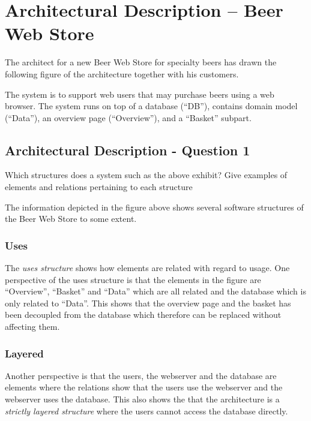 \section{Architectural Description -- Beer Web Store}

The architect for a new Beer Web Store for specialty beers has drawn
the following figure of the architecture together with his customers.
\begin{figure}[h!]
  \centerline{}
\end{figure}
The system is to support web users that may purchase beers using a web
browser. The system runs on top of a database (``DB''), contains
domain model (``Data''), an overview page (``Overview''), and a
``Basket'' subpart.

\subsection{Architectural Description - Question 1}
\label{sec:arch_desc_q1}

\begin{question}
Which structures does a system such as the above exhibit?
Give examples of elements and relations pertaining to each
structure
\end{question}

The information depicted in the figure above shows several
software structures of the Beer Web Store to some extent.

\subsubsection{Uses}

The \emph{uses structure} shows how elements are related with regard
to usage. One perspective of the uses structure is that the
elements in the figure are ``Overview'', ``Basket'' and ``Data''
which are all related and the database which is only related
to ``Data''. This shows that the overview page and the basket
has been decoupled from the database which therefore can be
replaced without affecting them.

\subsubsection{Layered}

Another perspective is that the users, the webserver and the
database are elements where the relations show that the users
use the webserver and the webserver uses the database. This
also shows the that the architecture is a
\emph{strictly layered structure} where the users cannot
access the database directly.

